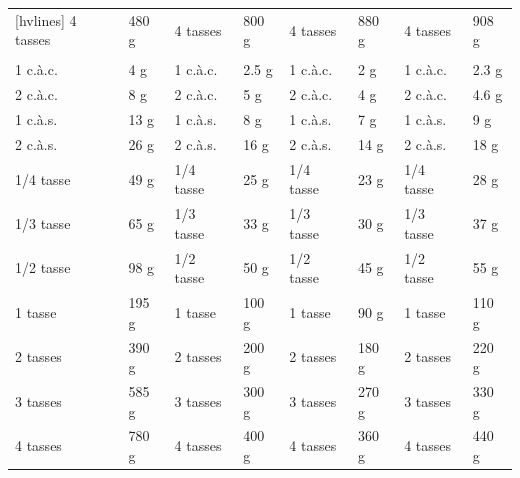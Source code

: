 \begin{table}
\begin{NiceTabular}{*{8}{m{.1\textwidth}}}[hvlines]
		4 tasses                       & 480 g & 4 tasses                            & 800 g & 4 tasses                                 & 880 g & 4 tasses                          & 908 g \\
		    &       &        &       &  &       &          \\
		1 c.à.c.                       & 4 g   & 1 c.à.c.                            & 2.5 g & 1 c.à.c.                                 & 2 g   & 1 c.à.c.                          & 2.3 g \\
		2 c.à.c.                       & 8 g   & 2 c.à.c.                            & 5 g   & 2 c.à.c.                                 & 4 g   & 2 c.à.c.                          & 4.6 g \\
		1 c.à.s.                       & 13 g  & 1 c.à.s.                            & 8 g   & 1 c.à.s.                                 & 7 g   & 1 c.à.s.                          & 9 g   \\
		2 c.à.s.                       & 26 g  & 2 c.à.s.                            & 16 g  & 2 c.à.s.                                 & 14 g  & 2 c.à.s.                          & 18 g  \\
		1/4 tasse                      & 49 g  & 1/4 tasse                           & 25 g  & 1/4 tasse                                & 23 g  & 1/4 tasse                         & 28 g  \\
		1/3 tasse                      & 65 g  & 1/3 tasse                           & 33 g  & 1/3 tasse                                & 30 g  & 1/3 tasse                         & 37 g  \\
		1/2 tasse                      & 98 g  & 1/2 tasse                           & 50 g  & 1/2 tasse                                & 45 g  & 1/2 tasse                         & 55 g  \\
		1 tasse                        & 195 g & 1 tasse                             & 100 g & 1 tasse                                  & 90 g  & 1 tasse                           & 110 g \\
		2 tasses                       & 390 g & 2 tasses                            & 200 g & 2 tasses                                 & 180 g & 2 tasses                          & 220 g \\
		3 tasses                       & 585 g & 3 tasses                            & 300 g & 3 tasses                                 & 270 g & 3 tasses                          & 330 g \\
		4 tasses                       & 780 g & 4 tasses                            & 400 g & 4 tasses                                 & 360 g & 4 tasses                          & 440 g \\
	\end{NiceTabular}
\end{table}


